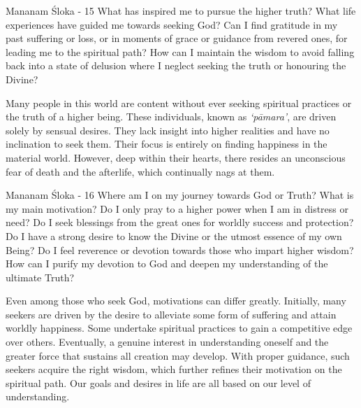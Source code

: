 
\newpage
\begin{mananam}{\mananamfont Mananam Śloka - 15}
\normalfont\mananamtext What has inspired me to pursue the higher truth? What life experiences have guided me towards seeking God? Can I find gratitude in my past suffering or loss, or in moments of grace or guidance from revered ones, for leading me to the spiritual path? How can I maintain the wisdom to avoid falling back into a state of delusion where I neglect seeking the truth or honouring the Divine?
\end{mananam}
\sreflect
\begin{inspiration}{}
\normalfont\mananamtext Many people in this world are content without ever seeking spiritual practices or the truth of a higher being. These individuals, known as \emph{‘pāmara’}, are driven solely by sensual desires. They lack insight into higher realities and have no inclination to seek them. Their focus is entirely on finding happiness in the material world. However, deep within their hearts, there resides an unconscious fear of death and the afterlife, which continually nags at them.
\end{inspiration}
\newpage

\begin{mananam}{\mananamfont Mananam Śloka - 16}
\normalfont\mananamtext Where am I on my journey towards God or Truth? What is my main motivation? Do I only pray to a higher power when I am in distress or need? Do I seek blessings from the great ones for worldly success and protection? Do I have a strong desire to know the Divine or the utmost essence of my own Being? Do I feel reverence or devotion towards those who impart higher wisdom? How can I purify my devotion to God and deepen my understanding of the ultimate Truth?
\end{mananam}
\sreflect
\begin{inspiration}{}
\normalfont\mananamtext Even among those who seek God, motivations can differ greatly. Initially, many seekers are driven by the desire to alleviate some form of suffering and attain worldly happiness. Some undertake spiritual practices to gain a competitive edge over others. Eventually, a genuine interest in understanding oneself and the greater force that sustains all creation may develop. With proper guidance, such seekers acquire the right wisdom, which further refines their motivation on the spiritual path. Our goals and desires in life are all based on our level of understanding. 
\end{inspiration}
\newpage



